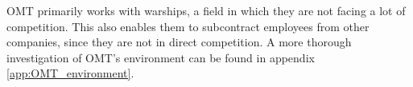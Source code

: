 OMT primarily works with warships, a field in which they are not facing a lot of competition.
This also enables them to subcontract employees from other companies, since they are not in direct competition.
A more thorough investigation of OMT's environment can be found in appendix \ref{app:OMT_environment}.
